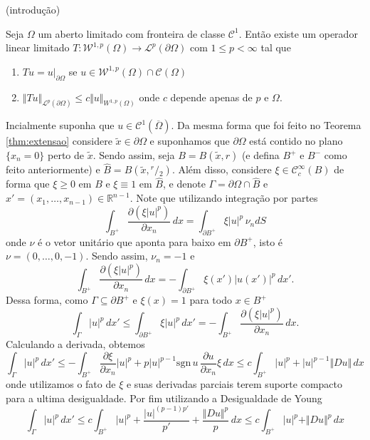 \documentclass[a4paper, 11pt]{book}
\theoremstyle{definition}
\newcommand{\bR}{\mathbb{R}}
\newcommand{\cC}{\mathcal{C}}
\newcommand{\cL}{\mathcal{L}}
\newcommand{\cW}{\mathcal{W}}
\newcommand{\sgn}{\mathrm{sgn}}
\newcommand{\sfrac}[2]{{}^{#1}\!\!/\!_{#2}}
\begin{document}
(introdução)

\begin{tbox}
    Seja $\Omega$ um aberto limitado com fronteira de classe $\cC^1$. Então existe um operador linear limitado $T : \cW^{1,p}(\Omega) \to \cL^p(\partial \Omega)$ com $1 \leqslant p < \infty$ tal que
    \begin{enumerate}[leftmargin=*, label=\textbf{(\alph*)}]
        \item $Tu = u \big|_{\partial \Omega}$ se $u \in \cW^{1,p}(\Omega) \cap \cC(\Omega)$
        \item $\Vert Tu \Vert_{\cL^p(\partial\Omega)} \leqslant c \Vert u \Vert_{W^{1,p}(\Omega)}$ onde $c$ depende apenas de $p$ e $\Omega$.
    \end{enumerate}
\end{tbox} 
\begin{prf}
    Incialmente suponha que $u \in \cC^1(\overline{\Omega})$. Da mesma forma que foi feito no Teorema \ref{thm:extensao} considere $\tilde x \in \partial\Omega$ e suponhamos que $\partial\Omega$ está contido no plano $\{x_n = 0\}$ perto de $\tilde x$.
    Sendo assim, seja $B = B(\tilde x, r)$ (e defina $B^+$ e $B^-$ como feito anteriormente) e $\widehat B = B(\tilde x, \sfrac{r}{2})$.
    Além disso, considere $\xi \in \cC^{\infty}_c(B)$ de forma que $\xi \geqslant 0$ em $B$ e $\xi \equiv 1$ em $\widehat B$, e denote $\Gamma = \partial \Omega \cap \widehat B$ e $x' = (x_1,\dots,x_{n-1}) \in \bR^{n-1}$.
    Note que utilizando integração por partes
    \[
        \int_{B^+} \dfrac{\partial (\xi |u|^p)}{\partial x_n}\,dx = \int_{\partial B^+} \xi |u|^p \, \nu_n dS
    \]
    onde $\nu$ é o vetor unitário que aponta para baixo em $\partial B^+$, isto é $\nu = (0,\dots,0,-1)$. Sendo assim, $\nu_n = -1$ e 
    \[
        \int_{B^+} \dfrac{\partial (\xi |u|^p)}{\partial x_n} \,dx = -\int_{\partial B^+} \xi(x') |u(x')|^p \,dx'.
    \]
    Dessa forma, como $\Gamma \subseteq \partial B^+$ e $\xi(x) = 1$ para todo $x \in B^+$
    \[
        \int_{\Gamma} |u|^p \,dx' \leqslant \int_{\partial B^+} \xi|u|^p \,dx' = -\int_{B^+} \dfrac{\partial (\xi |u|^p)}{\partial x_n} \,dx.
    \]
    Calculando a derivada, obtemos
    \[
        \int_\Gamma |u|^p \,dx' \leqslant - \int_{B^+} \dfrac{\partial \xi}{\partial x_n} |u|^p + p|u|^{p-1} \sgn\,u\,\dfrac{\partial u}{\partial x_n} \xi \,dx \leqslant c \int_{B^+} |u|^p + |u|^{p-1} \Vert Du \Vert \,dx
    \]
    onde utilizamos o fato de $\xi$ e suas derivadas parciais terem suporte compacto para a ultima desigualdade. Por fim utilizando a Desigualdade de Young
    \begin{equation} \label{eq:umaisdu}
        \int_\Gamma |u|^p \,dx' \leqslant c \int_{B^+} |u|^p + \frac{|u|^{(p-1)p'}}{p'} + \frac{\Vert Du \Vert^p}{p} \,dx \leqslant c \int_{B^+} |u|^p + \Vert Du \Vert^p \,dx
    \end{equation}


\end{prf}
\end{document}
